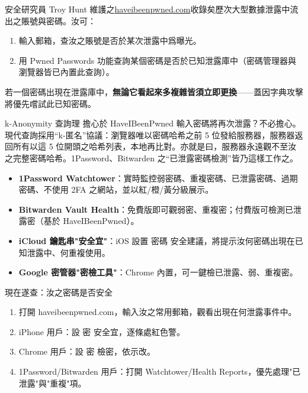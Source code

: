 安全研究員 Troy Hunt 維護之\href{https://haveibeenpwned.com}{haveibeenpwned.com}收錄矣歷次大型數據泄露中流出之賬號與密碼。汝可：

\begin{enumerate}
  \item 輸入郵箱，查汝之賬號是否於某次泄露中爲曝光。
  \item 用 Pwned Passwords 功能查詢某個密碼是否於已知泄露庫中（密碼管理器與瀏覽器皆已內置此查詢）。
\end{enumerate}

若一個密碼出現在泄露庫中，\textbf{無論它看起來多複雜皆須立即更換}——蓋因字典攻擊將優先嚐試此已知密碼。

\begin{tcbinfo}{k-Anonymity 查詢理}
擔心於 HaveIBeenPwned 輸入密碼將再次泄露？不必擔心。現代查詢採用“k-匿名”協議：瀏覽器唯以密碼哈希之前 5 位發給服務器，服務器返回所有以這 5 位開頭之哈希列表，本地再比對。亦就是曰，服務器永遠觀不至汝之完整密碼哈希。1Password、Bitwarden 之“已泄露密碼檢測”皆乃這樣工作之。

\end{tcbinfo}


\begin{itemize}
  \item \textbf{1Password Watchtower}：實時監控弱密碼、重複密碼、已泄露密碼、過期密碼、不使用 2FA 之網站，並以紅/橙/黃分級展示。
  \item \textbf{Bitwarden Vault Health}：免費版即可觀弱密、重複密；付費版可檢測已泄露密（基於 HaveIBeenPwned）。
  \item \textbf{iCloud 鑰匙串"安全宜"}：iOS 設置 密碼 安全建議，將提示汝何密碼出現在已知泄露中、何重複使用。
  \item \textbf{Google 密管器"密檢工具"}：Chrome 內置，可一鍵檢已泄露、弱、重複密。
\end{itemize}

\begin{tcbpractice}{現在遂查：汝之密碼是否安全}
\begin{enumerate}
  \item 打開 haveibeenpwned.com，輸入汝之常用郵箱，觀看出現在何泄露事件中。
  \item iPhone 用戶：設 密 安全宜，逐條處紅色警。
  \item Chrome 用戶：設 密 檢密，依示改。
  \item 1Password/Bitwarden 用戶：打開 Watchtower/Health Reports，優先處理"已泄露"與"重複"項。
\end{enumerate}

\end{tcbpractice}

